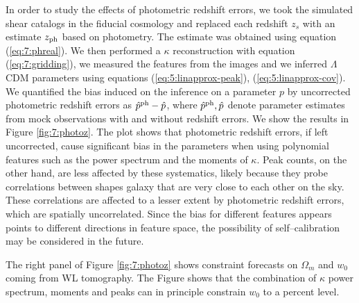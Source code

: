 In order to study the effects of photometric redshift errors, we took the simulated shear catalogs in the fiducial cosmology and replaced each redshift $z_s$ with an estimate $z_{\rm ph}$ based on photometry. The estimate was obtained using equation (\ref{eq:7:phreal}). We then performed a $\kappa$ reconstruction with equation (\ref{eq:7:gridding}), we measured the features from the images and we inferred $\Lambda$CDM parameters using equations (\ref{eq:5:linapprox-peak}), (\ref{eq:5:linapprox-cov}). We quantified the bias induced on the inference on a parameter $p$ by uncorrected photometric redshift errors as $\hat{p}^{\rm ph}-\hat{p}$, where $\hat{p}^{\rm ph},\hat{p}$ denote parameter estimates from mock observations with and without redshift errors. We show the results in Figure \ref{fig:7:photoz}. The plot shows that photometric redshift errors, if left uncorrected, cause significant bias in the parameters when using polynomial features such as the power spectrum and the moments of $\kappa$. Peak counts, on the other hand, are less affected by these systematics, likely because they probe correlations between shapes galaxy that are very close to each other on the sky. These correlations are affected to a lesser extent by photometric redshift errors, which are spatially uncorrelated. Since the bias for different features appears points to different directions in feature space, the possibility of self--calibration may be considered in the future.

The right panel of Figure \ref{fig:7:photoz} shows constraint forecasts on $\Omega_m$ and $w_0$ coming from WL tomography. The Figure shows that the combination of $\kappa$ power spectrum, moments and peaks can in principle constrain $w_0$ to a percent level.   

